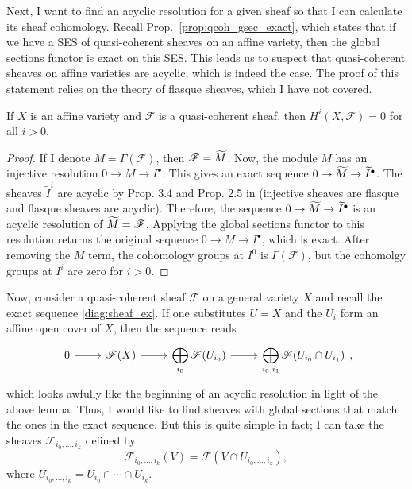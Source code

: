 Next, I want to find an acyclic resolution for a given sheaf so that I can
calculate its sheaf cohomology. Recall Prop.~\ref{prop:qcoh_gsec_exact},
which states that if we have a SES of quasi-coherent sheaves on an affine
variety, then the global sections functor is exact on this SES. This leads us
to suspect that quasi-coherent sheaves on affine varieties are acyclic,
which is indeed the case. The proof of this statement relies on the theory
of flasque sheaves, which I have not covered.
\begin{lemm}\label{lemm:affine_cohom_vanishes}
  If $X$ is an affine variety and $\mathscr{F}$ is a quasi-coherent
  sheaf, then $H^{i}(X, \mathscr{F})=0$ for all $i>0$.
\end{lemm}
\begin{proof}
  If I denote $M=\Gamma(\mathscr{F})$, then $\mathscr{F}=\widetilde{M}$. Now, the
  module $M$ has an injective resolution $0\to M\to I^{\bullet}$.
  This gives an exact sequence $0\to \widetilde{M}\to\widetilde{I}^{\bullet}$.
  The sheaves $\widetilde{I}^{i}$ are acyclic by Prop. 3.4 and Prop. 2.5
  in \cite{hartshorne} (injective sheaves are flasque and flasque sheaves
  are acyclic). Therefore, the sequence $0\to \widetilde{M}\to\widetilde{I}^{\bullet}$
  is an acyclic resolution of $\widetilde{M}=\mathscr{F}$. Applying the global sections
  functor to this resolution returns the original sequence
  $0\to M\to I^{\bullet}$, which is exact. After removing the $M$ term, the
  cohomology groups at $I^{0}$ is $\Gamma(\mathscr{F})$, but the cohomolgy
  groups at $I^{i}$ are zero for $i>0$.
\end{proof}
Now, consider a quasi-coherent sheaf $\mathscr{F}$ on a general variety $X$
and recall the exact sequence \eqref{diag:sheaf_ex}. If one substitutes $U=X$
and the $U_{i}$ form an affine open cover of $X$, then the sequence reads
\[\begin{tikzcd}
    0\rar & \mathscr{F}(X)\rar
    & \displaystyle\bigoplus_{i_{0}}\mathscr{F}(U_{i_{0}})\rar
    & \displaystyle\bigoplus_{i_{0},i_{1}}\mathscr{F}(U_{i_{0}}\cap U_{i_{1}})
  \end{tikzcd},\]
which looks awfully like the beginning of an acyclic resolution in light of
the above lemma. Thus, I would like to find sheaves with global sections
that match the ones in the exact sequence. But this is quite simple in fact;
I can take the sheaves
$\mathscr{F}_{i_{0},\ldots,i_{k}}$ defined by
\[
  \mathscr{F}_{i_{0},\ldots,i_{k}}(V)=\mathscr{F}(V\cap
  U_{i_{0},\ldots,i_{k}}),
\]
where $U_{i_{0},\ldots, i_{k}}=U_{i_{0}}\cap\cdots\cap U_{i_{k}}$.

